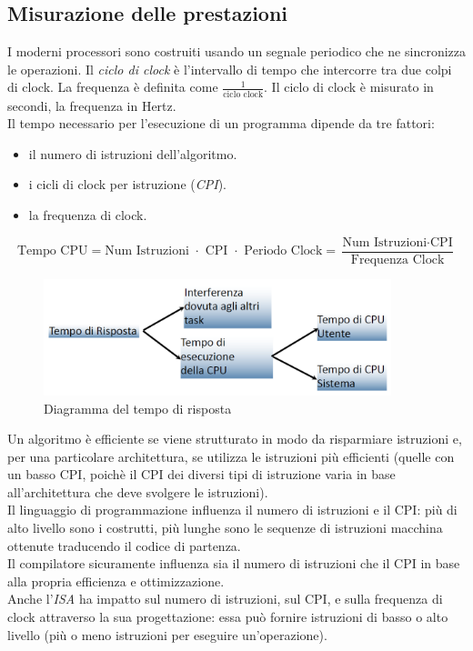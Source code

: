 \subsection{Misurazione delle prestazioni}
I moderni processori sono costruiti usando un segnale periodico che ne sincronizza le operazioni. Il \textit{ciclo di clock} è l’intervallo di tempo che intercorre tra due colpi di clock. La frequenza è definita come $\frac{1}{\text{ciclo clock}}$. Il ciclo di clock è misurato in secondi, la frequenza in Hertz.\\

Il tempo necessario per l'esecuzione di un programma dipende da tre fattori:
\begin{itemize}[nolistsep]
	\item il numero di istruzioni dell'algoritmo.
	\item i cicli di clock per istruzione (\textit{CPI}).
	\item la frequenza di clock.
\end{itemize}
\begin{equation*}
\text{Tempo CPU} = \text{Num Istruzioni } \cdot \text{ CPI } \cdot \text{ Periodo Clock} = \frac{\text{Num Istruzioni} \cdot \text{CPI}}{\text{Frequenza Clock}}
\end{equation*}

\begin{figure}[H]
	\centering
	\includegraphics[width=0.9\textwidth,keepaspectratio]{images/tempo_risposta.png}
	\caption{Diagramma del tempo di risposta}
\end{figure}
Un algoritmo è efficiente se viene strutturato in modo da risparmiare istruzioni e, per una particolare architettura, se utilizza le istruzioni più efficienti (quelle con un basso CPI, poichè il CPI dei diversi tipi di istruzione varia in base all'architettura che deve svolgere le istruzioni).\\
Il linguaggio di programmazione influenza il numero di istruzioni e il CPI: più di alto livello sono i costrutti, più lunghe sono le sequenze di istruzioni macchina ottenute traducendo il codice di partenza.\\
Il compilatore sicuramente influenza sia il numero di istruzioni che il CPI in base alla propria efficienza e ottimizzazione.\\
Anche l'\textit{ISA} ha impatto sul numero di istruzioni, sul CPI, e sulla frequenza di clock attraverso la sua progettazione: essa può fornire istruzioni di basso o alto livello (più o meno istruzioni per eseguire un'operazione).

